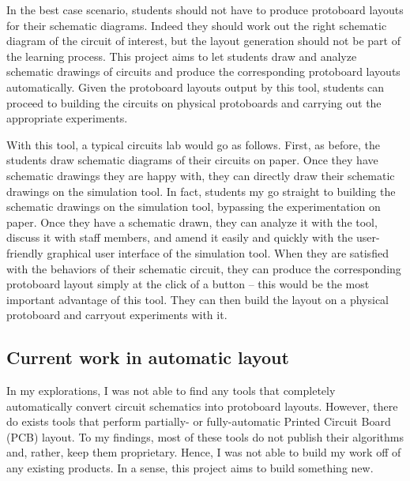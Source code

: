 In the best case scenario, students should not have to produce protoboard
layouts for their schematic diagrams. Indeed they should work out the right
schematic diagram of the circuit of interest, but the layout generation should
not be part of the learning process. This project aims to let students draw and
analyze schematic drawings of circuits and produce the corresponding protoboard
layouts automatically. Given the protoboard layouts output by this tool,
students can proceed to building the circuits on physical protoboards and
carrying out the appropriate experiments.

With this tool, a typical circuits lab would go as follows. First, as before,
the students draw schematic diagrams of their circuits on paper. Once they have
schematic drawings they are happy with, they can directly draw their schematic
drawings on the simulation tool. In fact, students my go straight to building
the schematic drawings on the simulation tool, bypassing the experimentation on
paper. Once they have a schematic drawn, they can analyze it with the tool,
discuss it with staff members, and amend it easily and quickly with the
user-friendly graphical user interface of the simulation tool. When they are
satisfied with the behaviors of their schematic circuit, they can produce the
corresponding protoboard layout simply at the click of a button -- this would be
the most important advantage of this tool. They can then build the layout on a
physical protoboard and carryout experiments with it.

\subsection{Current work in automatic layout}

In my explorations, I was not able to find any tools that completely
automatically convert circuit schematics into protoboard layouts. However, there
do exists tools that perform partially- or fully-automatic Printed Circuit
Board (PCB) layout. To my findings, most of these tools do not publish their
algorithms and, rather, keep them proprietary. Hence, I was not able to build my
work off of any existing products. In a sense, this project aims to build
something new.
